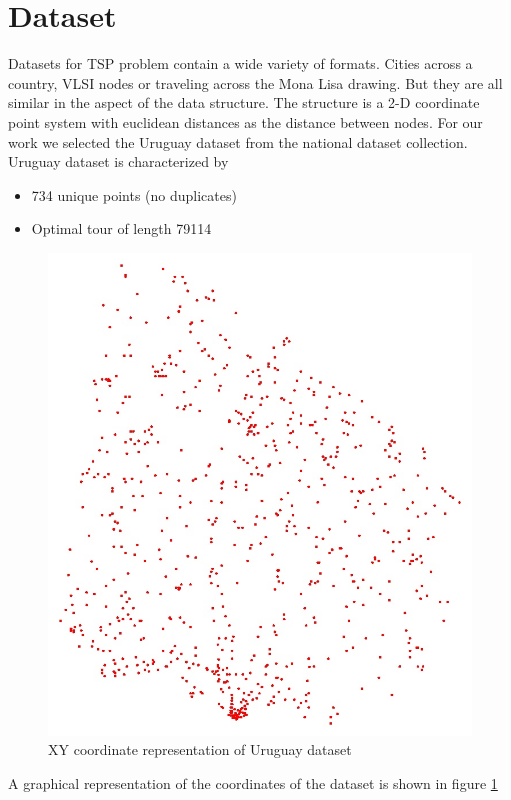 \documentclass[twocolumn]{article}
\begin{document}
	\section{Dataset}
	Datasets for TSP problem contain a wide variety of formats. Cities across a country, VLSI nodes or traveling across the Mona Lisa drawing. But they are all similar in the aspect of the data structure. The structure is a 2-D coordinate point system with euclidean distances as the distance between nodes.
	For our work we selected the Uruguay dataset from the national dataset collection. Uruguay dataset is characterized by 
	\begin{itemize}
		\item 734 unique points (no duplicates)
		\item Optimal tour of length 79114
	\end{itemize}
	\begin{figure}[h!]
		\centering
		\includegraphics[scale=0.3]{./tex/uypoints.jpg}
		\caption{XY coordinate representation of Uruguay dataset}
		\label{fig:uruguay}
	\end{figure}
	A graphical representation of the coordinates of the dataset is shown in figure \ref{fig:uruguay}
	
\end{document}
